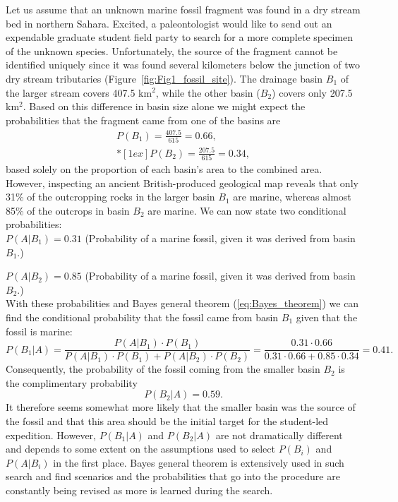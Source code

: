 \begin{example}
Let us assume that an unknown marine fossil 
fragment was found in a dry stream bed in northern Sahara.  Excited, a paleontologist would like to send out an
expendable graduate student field party to search for a more complete specimen of the unknown species.
Unfortunately, the source of the 
fragment cannot be identified uniquely since it was found several kilometers below the junction of two dry stream 
tributaries (Figure~\ref{fig:Fig1_fossil_site}).  The drainage basin $B_1$ of the larger stream covers
407.5 km$^2$, while the other basin ($B_2$) covers only 207.5 
km$^2$.  Based on this difference in basin size alone we might expect the probabilities that the fragment came from one of 
the basins are
\begin{equation}
\begin{array}{c}
P(B_1) = \frac{407.5} {615} = 0.66,\\*[1ex]
P(B_2) = \frac{207.5} {615} = 0.34,
\end{array}
\end{equation}
based solely on the proportion of each basin's area to the combined area.  However, inspecting an ancient British-produced geological map 
reveals that only 31\% of the outcropping rocks in the larger basin $B_1$ are marine, whereas almost 85\% of 
the outcrops in basin $B_2$ are marine.  We can now state two conditional probabilities:\\

	$P(A|B_1) = 0.31$  (Probability of a marine fossil, given it was derived from basin $B_1$.)

	$P(A|B_2) = 0.85$  (Probability of a marine fossil, given it was derived from basin $B_2$.)\\

\noindent
With these probabilities and Bayes general theorem (\ref{eq:Bayes_theorem}) we can find the conditional probability that 
the fossil came from basin $B_1$ given that the fossil is marine:
\begin{equation}
P(B_1|A) =
\frac{P(A|B_1) \cdot P (B_1)} {P(A|B_1) \cdot P (B_1) + P (A|B_2) \cdot P(B_2)}
=
\frac{0.31 \cdot 0.66}{0.31 \cdot 0.66 + 0.85 \cdot 0.34} = 0.41.
\end{equation}	 
Consequently, the probability of the fossil coming from the smaller basin $B_2$ is the complimentary probability
\begin{equation}
P(B_2|A) = 0.59.
\end{equation}	 
It therefore seems somewhat more likely that the smaller basin was the source of the fossil and that this area should be
the initial target for the student-led expedition.
However, $P(B_1|A)$ and $P(B_2|A)$ are not dramatically different and depends to some extent on the assumptions used to 
select $P(B_i)$ and $P(A|B_i)$ in the first place.
Bayes general theorem is extensively used in such search and find scenarios and the probabilities that go into
the procedure are constantly being revised as more is learned during the search.
\end{example}

